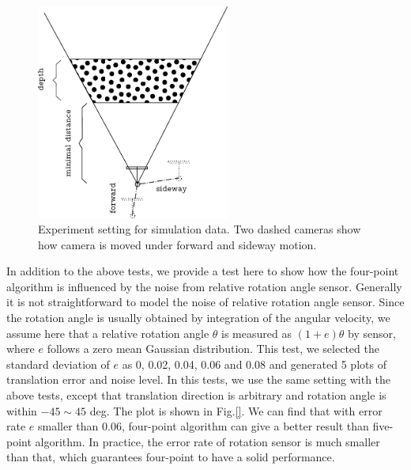 \documentclass[letterpaper, 10 pt, conference]{ieeeconf}
\begin{document}
\begin{figure}
\begin{center}
	\includegraphics[width=2.5in]{setting.pdf} 
\end{center}
\caption{Experiment setting for simulation data. Two dashed cameras show how camera is moved under forward and sideway motion. }
\label{SettingFigure}
\end{figure}

In addition to the above tests, we provide a test here to show how the four-point algorithm is influenced by the noise from relative rotation angle sensor. Generally it is not straightforward to model the noise of relative rotation angle sensor. Since the rotation angle is usually obtained by integration of the angular velocity, we assume here that a relative rotation angle $\theta$ is measured as $(1 + e) \theta$ by sensor, where $e$ follows a zero mean Gaussian distribution. This test, we selected the standard deviation of $e$ as 0, 0.02, 0.04, 0.06 and 0.08 and generated 5 plots of translation error and noise level. In this tests, we use the same setting with the above tests, except that translation direction is arbitrary and rotation angle is within $-45 \sim 45$ deg. The plot is shown in Fig.\ref{}. We can find that with error rate $e$ smaller than 0.06, four-point algorithm can give a better result than five-point algorithm. In practice, the error rate of rotation sensor is much smaller than that, which guarantees four-point to have a solid performance. 
\end{document}
